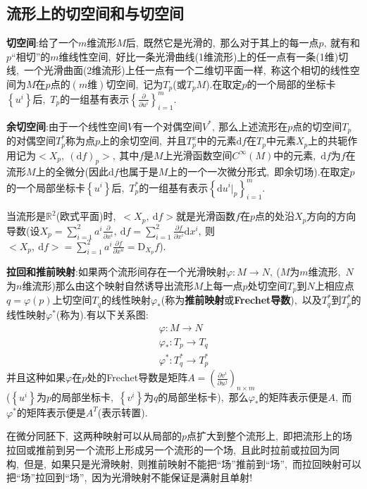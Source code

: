 \subsection{流形上的切空间和与切空间}
\textbf{切空间}:给了一个$m$维流形$M$后,\ 既然它是光滑的,\ 那么对于其上的每一点$p,\ $就有和$p$“相切”的$m$维线性空间,\ 好比一条光滑曲线(1维流形)上的任一点有一条(1维)切线,\ 一个光滑曲面(2维流形)上任一点有一个二维切平面一样,\ 称这个相切的线性空间为$M$在$p$点的$(m\text{维})$切空间,\ 记为$T_p$(或$T_pM$).在取定$p$的一个局部的坐标卡$\left\{u^i\right\}$后,\ $T_p$的一组基有表示$\left\{\frac{\partial}{\partial u^i}\right\}_{i=1}^{m}.$

\textbf{余切空间}:由于一个线性空间$V$有一个对偶空间$V^*,\ $那么上述流形在$p$点的切空间$T_p$的对偶空间$T_p^*$称为点$p$上的余切空间,\ 并且$T_p^x$中的元素$\text{d}f$在$T_p$中元素$X_p$上的共轭作用记为$<X_p,\ \left(\text{d}f\right)_p>,\ $其中$f$是$M$上光滑函数空间$C^{\infty}(M)$中的元素,\ $\text{d}f$为$f$在流形$M$上的全微分(因此$\text{d}f$也属于是$M$上的一个一次微分形式,\ 即余切场).在取定$p$的一个局部坐标卡$\left\{u^i\right\}$后,\ $T_p^*$的一组基有表示$\left\{\text{d}u^i|_p\right\}_{i=1}^m$.

当流形是$\mathbb{R}^2$(欧式平面)时,\ $<X_p,\ \text{d}f>$就是光滑函数$f$在$p$点的处沿$X_p$方向的方向导数(设$X_p=\sum\limits_{i=1}^{2}a^i\frac{\partial}{\partial x^i},\ \text{d}f=\sum\limits_{i=1}^{2}\frac{\partial f}{\partial x^i}\text{d}x^i,\ $则$<X_p,\ \text{d}f>=\sum\limits_{i=1}^{2}a^i\frac{\partial f}{\partial x^u}=\text{D}_{X_p}f$).

\textbf{拉回和推前映射}:如果两个流形间存在一个光滑映射$\varphi:M\rightarrow N,\ $($M$为$m$维流形,\ $N$为$n$维流形)那么由这个映射自然诱导出流形$M$上每一点$p$处切空间$T_p$到$N$上相应点$q=\varphi(p)$上切空间$T_q$的线性映射$\varphi_*$(称为\textbf{推前映射}或\textbf{Frechet导数}),\ 以及$T_q^*$到$T_p^*$的线性映射$\varphi^*$(称为).有以下关系图:
\begin{align*}
	\varphi:M\rightarrow N\\
	\varphi_*:T_p\rightarrow T_q\\
	\varphi^*:T_q^*\rightarrow T_p^*
\end{align*} 
并且这种如果$\varphi$在$p$处的Frechet导数是矩阵$A=\left(\frac{\partial v^i}{\partial u^j}\right)_{n\times m}$\\
($\left\{u^i\right\}$为$p$的局部坐标卡,\ $\left\{v^i\right\}$为$q$的局部坐标卡),\ 那么$\varphi_*$的矩阵表示便是$A,\ $而$\varphi^*$的矩阵表示便是$A^T$(表示转置).
\begin{note}
	在微分同胚下,\ 这两种映射可以从局部的$p$点扩大到整个流形上,\ 即把流形上的场拉回或推前到另一个流形上形成另一个流形的一个场,\ 且此时拉前或拉回为同构,\ 但是,\ 如果只是光滑映射,\ 则推前映射不能把“场”推前到“场”,\ 而拉回映射可以把“场”拉回到“场”,\ 因为光滑映射不能保证是满射且单射!
\end{note}
